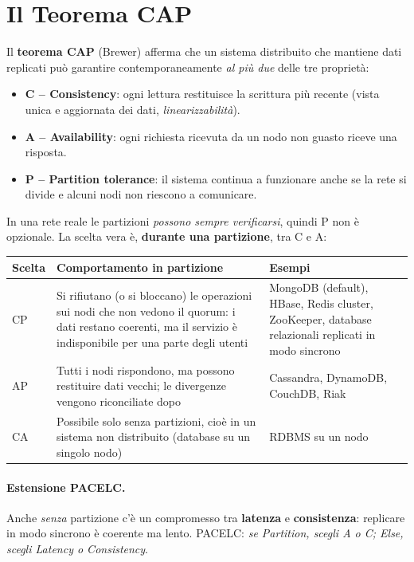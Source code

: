 \section{Il Teorema CAP}
Il \textbf{teorema CAP} (Brewer) afferma che un sistema distribuito che mantiene dati replicati può garantire contemporaneamente \emph{al più due} delle tre proprietà:

\begin{itemize}
    \item \textbf{C -- Consistency}: ogni lettura restituisce la scrittura più recente (vista unica e aggiornata dei dati, \emph{linearizzabilità}).
    \item \textbf{A -- Availability}: ogni richiesta ricevuta da un nodo non guasto riceve una risposta.
    \item \textbf{P -- Partition tolerance}: il sistema continua a funzionare anche se la rete si divide e alcuni nodi non riescono a comunicare.
\end{itemize}

In una rete reale le partizioni \emph{possono sempre verificarsi}, quindi P non è opzionale. La scelta vera è, \textbf{durante una partizione}, tra C e A:

\begin{center}
\begin{tabularx}{\textwidth}{@{}lXX@{}}
\toprule
\textbf{Scelta} & \textbf{Comportamento in partizione} & \textbf{Esempi} \\
\midrule
CP & Si rifiutano (o si bloccano) le operazioni sui nodi che non vedono il quorum: i dati restano coerenti, ma il servizio è indisponibile per una parte degli utenti & MongoDB (default), HBase, Redis cluster, ZooKeeper, database relazionali replicati in modo sincrono \\
AP & Tutti i nodi rispondono, ma possono restituire dati vecchi; le divergenze vengono riconciliate dopo & Cassandra, DynamoDB, CouchDB, Riak \\
CA & Possibile solo senza partizioni, cioè in un sistema non distribuito (database su un singolo nodo) & RDBMS su un nodo \\
\bottomrule
\end{tabularx}
\end{center}

\paragraph{Estensione PACELC.} Anche \emph{senza} partizione c'è un compromesso tra \textbf{latenza} e \textbf{consistenza}: replicare in modo sincrono è coerente ma lento. PACELC: \emph{se Partition, scegli A o C; Else, scegli Latency o Consistency}.

